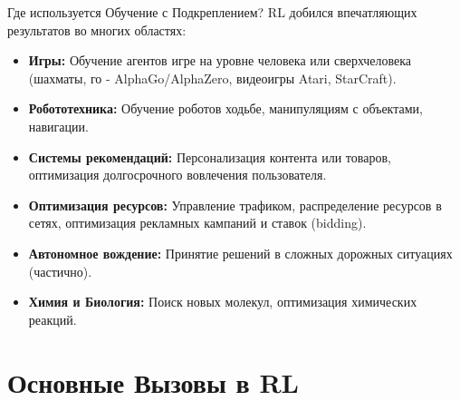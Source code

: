 \begin{textbox}{Где используется Обучение с Подкреплением?}
    RL добился впечатляющих результатов во многих областях:
    \begin{itemize}
        \item \textbf{Игры:} Обучение агентов игре на уровне человека или сверхчеловека (шахматы, го - AlphaGo/AlphaZero, видеоигры Atari, StarCraft).
        \item \textbf{Робототехника:} Обучение роботов ходьбе, манипуляциям с объектами, навигации.
        \item \textbf{Системы рекомендаций:} Персонализация контента или товаров, оптимизация долгосрочного вовлечения пользователя.
        \item \textbf{Оптимизация ресурсов:} Управление трафиком, распределение ресурсов в сетях, оптимизация рекламных кампаний и ставок (bidding).
        \item \textbf{Автономное вождение:} Принятие решений в сложных дорожных ситуациях (частично).
        \item \textbf{Химия и Биология:} Поиск новых молекул, оптимизация химических реакций.
    \end{itemize}
\end{textbox}

\section{Основные Вызовы в RL}


